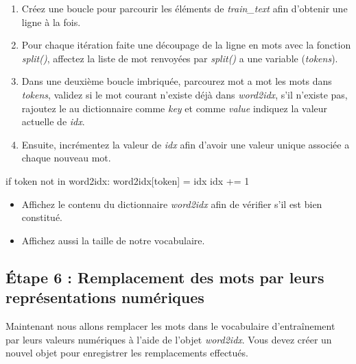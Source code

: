 \begin{enumerate}
	\item Créez une boucle pour parcourir les éléments de \textit{train\_text} afin d'obtenir une ligne à la fois.
	\item Pour chaque itération faite une découpage de la ligne en mots avec la fonction \textit{split()}, affectez la liste de mot renvoyées par \textit{split()} a une variable (\textit{tokens}).
	\item Dans une deuxième boucle imbriquée, parcourez mot a mot les mots dans \textit{tokens}, validez si le mot courant n'existe déjà dans \textit{word2idx}, s'il n'existe pas, rajoutez le au dictionnaire comme \textit{key} et comme \textit{value} indiquez la valeur actuelle de \textit{idx}.
	\item Ensuite, incrémentez la valeur de \textit{idx} afin d'avoir une valeur unique associée a chaque nouveau mot.
\end{enumerate}


\begin{python}
	if token not in word2idx:
	 word2idx[token] = idx
	 idx += 1
\end{python}

\begin{itemize}
	\item Affichez le contenu du dictionnaire \textit{word2idx} afin de vérifier s'il est bien constitué.
	\item Affichez aussi la taille de notre vocabulaire.
\end{itemize}

\subsection{Étape 6 : Remplacement des mots par leurs représentations numériques}

Maintenant nous allons remplacer les mots dans le vocabulaire d'entraînement par leurs valeurs numériques à l'aide de l'objet \textit{word2idx}. Vous devez créer un nouvel objet pour enregistrer les remplacements effectués.

